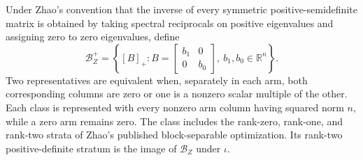 Under Zhao's convention that the inverse of every symmetric positive-semidefinite matrix is obtained by taking spectral reciprocals on positive eigenvalues and assigning zero to zero eigenvalues, define
\[
\mathcal B_Z^+=\left\{[B]_+:B=\begin{bmatrix}b_1&0\\0&b_0\end{bmatrix},\ b_1,b_0\in\mathbb R^n\right\}.
\]
Two representatives are equivalent when, separately in each arm, both corresponding columns are zero or one is a nonzero scalar multiple of the other.  Each class is represented with every nonzero arm column having squared norm \(n\), while a zero arm remains zero.  The class includes the rank-zero, rank-one, and rank-two strata of Zhao's published block-separable optimization.  Its rank-two positive-definite stratum is the image of \(\mathcal B_Z\) under \(\iota\).